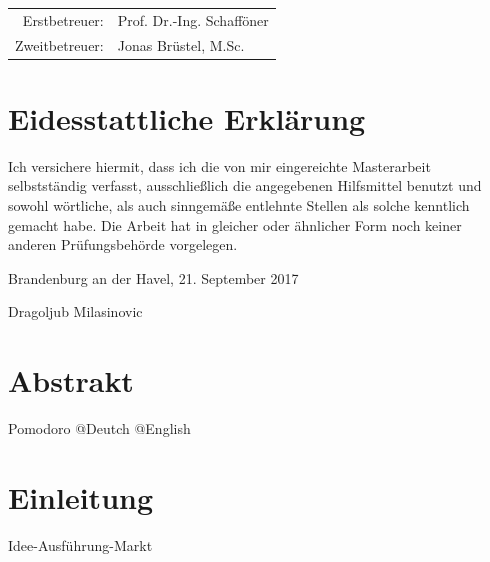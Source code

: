 \documentclass[
12pt,
english,
ngerman,
headsepline,
twoside,
openright,
numbers=noenddot,version=first
]{scrreprt}
\providecommand{\tabularnewline}{\\}
\let\myTOC\tableofcontents
\renewcommand\tableofcontents{
\begin{spacing}{1.1}
\myTOC
\end{spacing}
\clearpage
\pagenumbering{arabic}
}
\begin{document}
\vspace{1cm}

\noindent \begin{center}
\medskip{}
\begin{tabular}{rl}
Erstbetreuer: & Prof. Dr.-Ing. Schafföner\tabularnewline
Zweitbetreuer: & Jonas Brüstel, M.Sc.\tabularnewline
\end{tabular}
\par\end{center}

\noindent \begin{center}
{\huge }
\par\end{center}{\huge \par}

\newpage{}

%
\tableofcontents{}

\pagestyle{scrheadings}

\chapter*{Eidesstattliche Erklärung}

Ich versichere hiermit, dass ich die von mir eingereichte Masterarbeit selbstständig verfasst, ausschließlich die angegebenen Hilfsmittel benutzt und sowohl wörtliche, als auch sinngemäße entlehnte Stellen als solche kenntlich gemacht habe. Die Arbeit hat in gleicher oder ähnlicher Form noch keiner anderen Prüfungsbehörde vorgelegen.

Brandenburg an der Havel, 21. September 2017

\vspace{3cm}

Dragoljub Milasinovic

\chapter*{Abstrakt}
Pomodoro
@Deutch
@English

\chapter{Einleitung}{Idee-Ausführung-Markt}
\setcounter{page}{1}
\label{chap:introduction}
\end{document}
